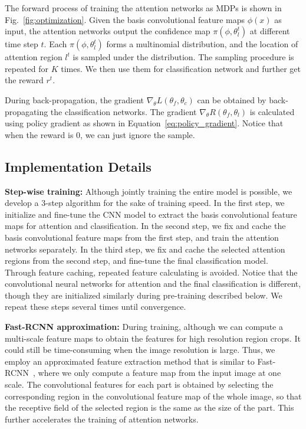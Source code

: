 \documentclass[10pt,twocolumn,letterpaper]{article}
\begin{document}
The forward process of training the attention networks as MDPs is shown in Fig.~\ref{fig:optimization}. Given the basis convolutional feature maps $\phi(x)$ as input, the attention networks output the confidence map $\pi(\phi, \theta^t_l)$ at different time step $t$. Each $\pi(\phi, \theta^t_l)$ forms a multinomial distribution, and the location of attention region $l^t$ is sampled under the distribution. The sampling procedure is repeated for $K$ times. We then use them for classification network and further get the reward $r^t$.

During back-propagation, the gradient $\nabla_{\theta} L(\theta_f, \theta_c)$ can be  obtained by back-propagating the classification networks.
The gradient $\nabla_{\theta} R(\theta_f, \theta_l)$ is calculated using policy gradient as shown in Equation~\ref{eq:policy_gradient}.
Notice that when the reward is 0, we can just ignore the sample.

\subsection{Implementation Details}

\textbf{Step-wise training:} Although jointly training the entire model is possible, we develop a 3-step algorithm for the sake of training speed.
In the first step, we initialize and fine-tune the CNN model to extract the basis convolutional feature maps for attention and classification.
In the second step, we fix and cache the basis convolutional feature maps from the first step, and train the attention networks separately.
In the third step, we fix and cache the selected attention regions from the second step, and fine-tune the final classification model.
Through feature caching, repeated feature calculating is avoided.
Notice that the convolutional neural networks for attention and the final classification is different, though they are initialized similarly during pre-training described below.
We repeat these steps several times until convergence.

\textbf{Fast-RCNN approximation:} During training, although we can compute a multi-scale feature maps to obtain the features for high resolution region crops. It could still be time-consuming when the image resolution is large.
Thus, we employ an approximated feature extraction method that is similar to Fast-RCNN~\cite{girshick2015fast}, where we only compute a feature map from the input image at one scale.
The convolutional features for each part is obtained by selecting the corresponding region in the convolutional feature map of the whole image, so that the receptive field of the selected region is the same as the size of the part.
This further accelerates the training of attention networks.
\end{document}
